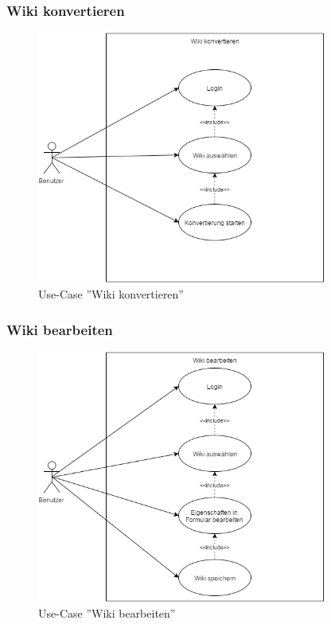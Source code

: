 \label{app:use_case_diagramm}

	\subsubsection{Wiki konvertieren}	
	\begin{figure}[H]
	\begin{center}
	\includegraphics[width=0.85\textwidth]{images/UC_wiki_konvertieren}	
	\caption{Use-Case ''Wiki konvertieren''}	
	\end{center}
	\end{figure}
	
	\subsubsection{Wiki bearbeiten}	
	\begin{figure}[H]
	\begin{center}
	\includegraphics[width=0.85\textwidth]{images/UC_wiki_bearbeiten}	
	\caption{Use-Case ''Wiki bearbeiten''}
	\end{center}
	\end{figure}
	